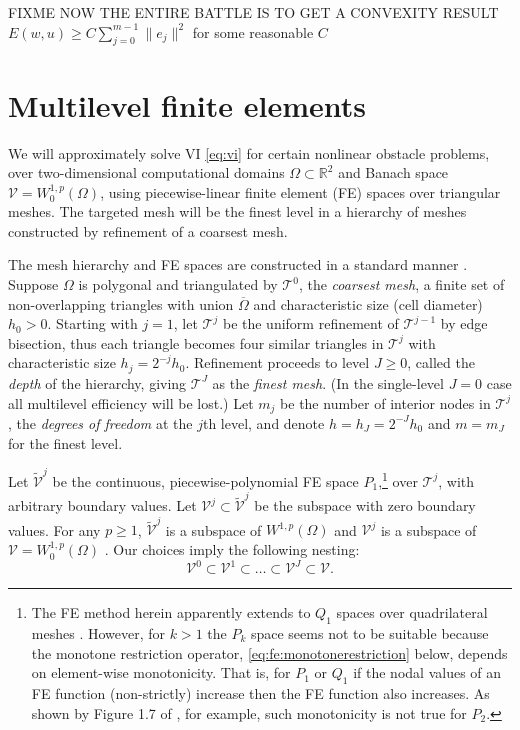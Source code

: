 \documentclass[letterpaper,final,12pt,reqno]{amsart}
\theoremstyle{cstyle}
\theoremstyle{cstyle*}
\theoremstyle{dstyle}
\numberwithin{equation}{section}
\numberwithin{figure}{section}
\numberwithin{table}{section}
\numberwithin{theorem}{section}
\newcommand{\RR}{\mathbb{R}}
\begin{document}
FIXME NOW THE ENTIRE BATTLE IS TO GET A CONVEXITY RESULT $E(w,u) \ge C \sum_{j=0}^{m-1} \|e_j\|^2$ for some reasonable $C$


\section{Multilevel finite elements} \label{sec:fe}

We will approximately solve VI \eqref{eq:vi} for certain nonlinear obstacle problems, over two-dimensional computational domains $\Omega \subset \RR^2$ and Banach space $\mathcal{V}=W_0^{1,p}(\Omega)$, using piecewise-linear finite element (FE) spaces over triangular meshes.  The targeted mesh will be the finest level in a hierarchy of meshes constructed by refinement of a coarsest mesh.

The mesh hierarchy and FE spaces are constructed in a standard manner \cite{Elmanetal2014}.  Suppose $\Omega$ is polygonal and triangulated by $\mathcal{T}^0$, the \emph{coarsest mesh}, a finite set of non-overlapping triangles with union $\overline{\Omega}$ and characteristic size (cell diameter) $h_0>0$.  Starting with $j=1$, let $\mathcal{T}^j$ be the uniform refinement of $\mathcal{T}^{j-1}$ by edge bisection, thus each triangle becomes four similar triangles in $\mathcal{T}^j$ with characteristic size $h_j = 2^{-j} h_0$.  Refinement proceeds to level $J\ge 0$, called the \emph{depth} of the hierarchy, giving $\mathcal{T}^J$ as the \emph{finest mesh}.  (In the single-level $J=0$ case all multilevel efficiency will be lost.)  Let $m_j$ be the number of interior nodes in $\mathcal{T}^j$, the \emph{degrees of freedom} at the $j$th level, and denote $h=h_J=2^{-J} h_0$ and $m=m_J$ for the finest level.

Let $\tilde{\mathcal{V}}^j$ be the continuous, piecewise-polynomial FE space $P_1$,\footnote{The FE method herein apparently extends to $Q_1$ spaces over quadrilateral meshes \cite{Elmanetal2014}.  However, for $k>1$ the $P_k$ space seems not to be suitable because the monotone restriction operator, \eqref{eq:fe:monotonerestriction} below, depends on element-wise monotonicity.  That is, for $P_1$ or $Q_1$ if the nodal values of an FE function (non-strictly) increase then the FE function also increases.  As shown by Figure 1.7 of \cite{Elmanetal2014}, for example, such monotonicity is not true for $P_2$.} over $\mathcal{T}^j$, with arbitrary boundary values.  Let $\mathcal{V}^j \subset \tilde{\mathcal{V}}^j$ be the subspace with zero boundary values.  For any $p\ge 1$, $\tilde{\mathcal{V}}^j$ is a subspace of $W^{1,p}(\Omega)$ and $\mathcal{V}^j$ is a subspace of $\mathcal{V}=W_0^{1,p}(\Omega)$ \cite{Elmanetal2014}.  Our choices imply the following nesting:
\begin{equation}
\mathcal{V}^0 \subset \mathcal{V}^1 \subset \dots \subset \mathcal{V}^J \subset \mathcal{V}.  \label{eq:fe:nestedspaces}
\end{equation}
\end{document}
